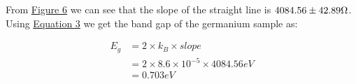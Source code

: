 		From \hyperref[graph:4]{Figure 6} we can see that the slope of the straight line is $4084.56\pm42.89\ohm$. Using \hyperref[eq:3]{Equation 3} we get the band gap of the germanium sample as:

		\begin{equation}
			\begin{split}
				E_g &= 2\times k_B\times slope\\
				&= 2\times8.6\times10^{-5}\times 4084.56 eV\\
				&= 0.703 eV
			\end{split}
		\end{equation}
		
